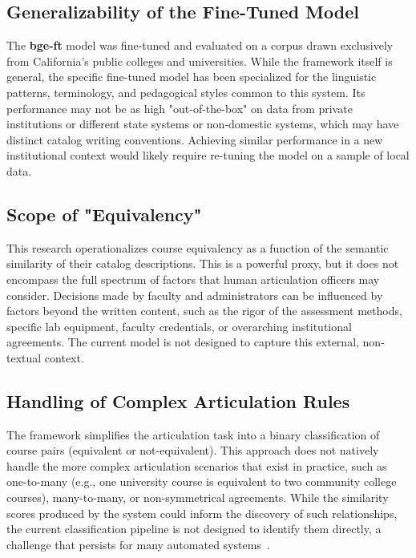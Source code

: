 \subsection{Generalizability of the Fine-Tuned Model}\label{ch:5.2.2}
The \textbf{bge-ft} model was fine-tuned and evaluated on a corpus drawn exclusively from California's public colleges and universities. While the framework itself is general, the specific fine-tuned model has been specialized for the linguistic patterns, terminology, and pedagogical styles common to this system. Its performance may not be as high "out-of-the-box" on data from private institutions or different state systems or non-domestic systems, which may have distinct catalog writing conventions. Achieving similar performance in a new institutional context would likely require re-tuning the model on a sample of local data.

\subsection{Scope of "Equivalency"}\label{ch:5.2.3}
This research operationalizes course equivalency as a function of the semantic similarity of their catalog descriptions. This is a powerful proxy, but it does not encompass the full spectrum of factors that human articulation officers may consider. Decisions made by faculty and administrators can be influenced by factors beyond the written content, such as the rigor of the assessment methods, specific lab equipment, faculty credentials, or overarching institutional agreements. The current model is not designed to capture this external, non-textual context.

\subsection{Handling of Complex Articulation Rules}\label{ch:5.2.4}
The framework simplifies the articulation task into a binary classification of course pairs (equivalent or not-equivalent). This approach does not natively handle the more complex articulation scenarios that exist in practice, such as one-to-many (e.g., one university course is equivalent to two community college courses), many-to-many, or non-symmetrical agreements. While the similarity scores produced by the system could inform the discovery of such relationships, the current classification pipeline is not designed to identify them directly, a challenge that persists for many automated systems~\cite{pardos-articulation-2019}.

